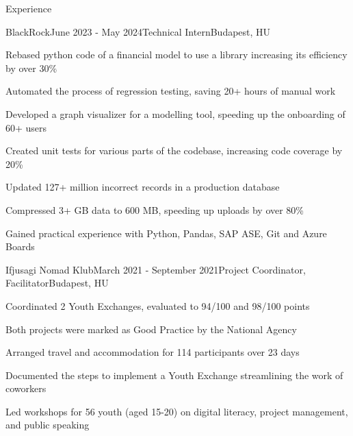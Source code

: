 \documentclass[
	a4paper, %
	11pt, %
]{resume} %
\begin{document}
\begin{rSection}{Experience}

	\begin{rSubsection}{BlackRock}{June 2023 - May 2024}{Technical Intern}{Budapest, HU}
		\item Rebased python code of a financial model to use a library increasing its efficiency by over 30\%
		\item Automated the process of regression testing, saving 20+ hours of manual work
		\item Developed a graph visualizer for a modelling tool, speeding up the onboarding of 60+ users
		\item Created unit tests for various parts of the codebase, increasing code coverage by 20\%
		\item Updated 127+ million incorrect records in a production database
		\item Compressed 3+ GB data to 600 MB, speeding up uploads by over 80\%
		\item Gained practical experience with Python, Pandas, SAP ASE, Git and Azure Boards
	\end{rSubsection}

	\begin{rSubsection}{Ifjusagi Nomad Klub}{March 2021 - September 2021}{Project Coordinator, Facilitator}{Budapest, HU}
		\item Coordinated 2 Youth Exchanges, evaluated to 94/100 and 98/100 points
		\item Both projects were marked as Good Practice by the National Agency
		\item Arranged travel and accommodation for 114 participants over 23 days
		\item Documented the steps to implement a Youth Exchange streamlining the work of coworkers
		\item Led workshops for 56 youth (aged 15-20) on digital literacy, project management, and public speaking
	\end{rSubsection}

\end{rSection}

\end{document}
